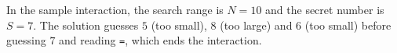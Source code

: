 In the sample interaction, the search range is $N = 10$ and the secret number
is $S = 7$. The solution guesses $5$ (too small), $8$ (too large) and $6$ (too
small) before guessing $7$ and reading \texttt{=}, which ends the interaction.

